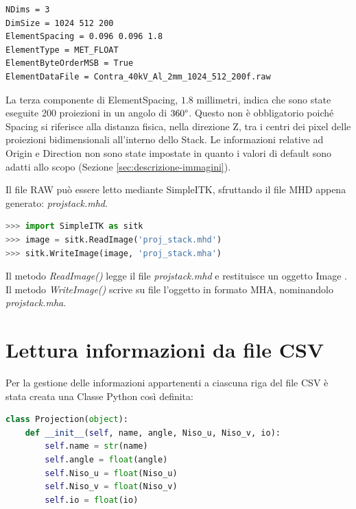 \documentclass[a4paper,12pt, doubleside]{report}
\begin{document}
                \begin{lstlisting}[language=bash, frame=bt]
NDims = 3
DimSize = 1024 512 200
ElementSpacing = 0.096 0.096 1.8
ElementType = MET_FLOAT
ElementByteOrderMSB = True
ElementDataFile = Contra_40kV_Al_2mm_1024_512_200f.raw
                \end{lstlisting}
                    
                La terza componente di ElementSpacing, $1.8$ millimetri, indica che sono state eseguite 200 proiezioni in un angolo di $360\degree$. Questo non è obbligatorio poiché Spacing si riferisce alla distanza fisica, nella direzione Z, tra i centri dei pixel delle proiezioni bidimensionali all'interno dello Stack. Le informazioni relative ad Origin e Direction non sono state impostate in quanto i valori di default sono adatti allo scopo (Sezione \ref{sec:descrizione-immagini}).
                    
                \bigskip
                \par
                Il file RAW può essere letto mediante SimpleITK, sfruttando il file MHD appena generato: \textit{proj\textunderscore stack.mhd}.
                   
                \begin{lstlisting}[language=python, frame=bt]
>>> import SimpleITK as sitk
>>> image = sitk.ReadImage('proj_stack.mhd')
>>> sitk.WriteImage(image, 'proj_stack.mha')
                \end{lstlisting}
                    
                Il metodo \textit{ReadImage()} legge il file \textit{proj\textunderscore stack.mhd} e restituisce un oggetto Image \cite{itk-image-object}. Il metodo \textit{WriteImage()} \cite{sitk-write-image} scrive su file l'oggetto in formato MHA, nominandolo \textit{proj\textunderscore stack.mha}. 
        
        \section{Lettura informazioni da file CSV}
            \label{sec:lettura-csv}
            
            \par
                Per la gestione delle informazioni appartenenti a ciascuna riga del file CSV è stata creata una Classe Python così definita:
            
                \begin{lstlisting}[language=python, frame=bt]
class Projection(object):
    def __init__(self, name, angle, Niso_u, Niso_v, io):
        self.name = str(name)
        self.angle = float(angle)
        self.Niso_u = float(Niso_u)
        self.Niso_v = float(Niso_v)
        self.io = float(io)
                \end{lstlisting}
            
\end{document}
